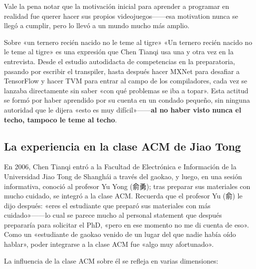 \documentclass[a4paper]{article}
\begin{document}
Vale la pena notar que la motivación inicial para aprender a programar en realidad fue querer hacer sus propios videojuegos------esa motivation nunca se llegó a cumplir, pero lo llevó a un mundo mucho más amplio.

\begin{warningbox}{Sobre «un ternero recién nacido no le teme al tigre»}
«Un ternero recién nacido no le teme al tigre» es una expresión que Chen Tianqi usa una y otra vez en la entrevista. Desde el estudio autodidacta de competencias en la preparatoria, pasando por escribir el transpiler, hasta después hacer MXNet para desafiar a TensorFlow y hacer TVM para entrar al campo de los compiladores, cada vez se lanzaba directamente sin saber «con qué problemas se iba a topar». Esta actitud se formó por haber aprendido por su cuenta en un condado pequeño, sin ninguna autoridad que le dijera «esto es muy difícil»------\textbf{al no haber visto nunca el techo, tampoco le teme al techo}.
\end{warningbox}

\subsection{La experiencia en la clase ACM de Jiao Tong}

En 2006, Chen Tianqi entró a la Facultad de Electrónica e Información de la Universidad Jiao Tong de Shanghái a través del gaokao, y luego, en una sesión informativa, conoció al profesor Yu Yong (俞勇); tras preparar sus materiales con mucho cuidado, se integró a la clase ACM. Recuerda que el profesor Yu (俞) le dijo después: «eres el estudiante que preparó sus materiales con más cuidado»------lo cual se parece mucho al personal statement que después prepararía para solicitar el PhD, «pero en ese momento no me di cuenta de eso». Como un «estudiante de gaokao venido de un lugar del que nadie había oído hablar», poder integrarse a la clase ACM fue «algo muy afortunado».

La influencia de la clase ACM sobre él se refleja en varias dimensiones:
\end{document}
